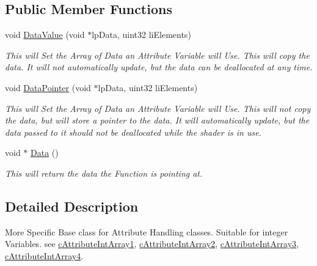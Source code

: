 \subsection*{Public Member Functions}
\begin{DoxyCompactItemize}
\item 
\hypertarget{classc_int_attribute_store_a259389363c8795340625fb46de6f1ab0}{
void \hyperlink{classc_int_attribute_store_a259389363c8795340625fb46de6f1ab0}{DataValue} (void $\ast$lpData, uint32 liElements)}
\label{classc_int_attribute_store_a259389363c8795340625fb46de6f1ab0}

\begin{DoxyCompactList}\small\item\em This will Set the Array of Data an Attribute Variable will Use. This will copy the data. It will not automatically update, but the data can be deallocated at any time. \end{DoxyCompactList}\item 
\hypertarget{classc_int_attribute_store_acc2f82fd0dbaab535be958132bf39c6e}{
void \hyperlink{classc_int_attribute_store_acc2f82fd0dbaab535be958132bf39c6e}{DataPointer} (void $\ast$lpData, uint32 liElements)}
\label{classc_int_attribute_store_acc2f82fd0dbaab535be958132bf39c6e}

\begin{DoxyCompactList}\small\item\em This will Set the Array of Data an Attribute Variable will Use. This will not copy the data, but will store a pointer to the data. It will automatically update, but the data passed to it should not be deallocated while the shader is in use. \end{DoxyCompactList}\item 
\hypertarget{classc_int_attribute_store_aecb0e3f10117f4d85e184537a4cc512a}{
void $\ast$ \hyperlink{classc_int_attribute_store_aecb0e3f10117f4d85e184537a4cc512a}{Data} ()}
\label{classc_int_attribute_store_aecb0e3f10117f4d85e184537a4cc512a}

\begin{DoxyCompactList}\small\item\em This will return the data the Function is pointing at. \end{DoxyCompactList}\end{DoxyCompactItemize}


\subsection{Detailed Description}
More Specific Base class for Attribute Handling classes. Suitable for integer Variables. see \hyperlink{classc_attribute_int_array1}{cAttributeIntArray1}, \hyperlink{classc_attribute_int_array2}{cAttributeIntArray2}, \hyperlink{classc_attribute_int_array3}{cAttributeIntArray3}, \hyperlink{classc_attribute_int_array4}{cAttributeIntArray4}. 
